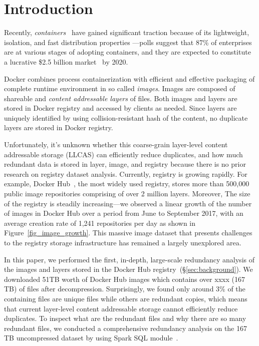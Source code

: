 \section{Introduction}

	
Recently, \emph{containers}~\cite{process-containers-linux} have
gained significant traction because of its lightweight, isolation, and fast distribution properties
---polls suggest that 87\% of enterprises are
at various stages of adopting containers, and they are expected to
constitute a lucrative \$2.5 billion
market~\cite{container-grow-by2020} by 2020.

Docker combines process containerization with efficient and
effective packaging of complete runtime environment
in so called {\em images}.
Images are composed of shareable and
{\em content addressable layers} of files. Both images
and layers are stored in Docker registry and accessed by clients as needed. 
Since 
layers are uniquely identified by using collision-resistant hash of the content, no duplicate layers are stored in Docker registry.

Unfortunately, it's unknown whether  
this coarse-grain layer-level content addressable storage (LLCAS) can efficiently reduce duplicates, and how much redundant data is stored in layer, image, and registry because there is no prior research on registry dataset analysis. Currently, registry is growing rapidly. For example,   
Docker Hub~\cite{docker-hub}, the most widely used registry, stores more than 500,000 public image repositories comprising of over 2 million layers. Moreover,
The size of the registry 
is steadily increasing---we observed a linear growth of the
number of images in Docker Hub over a period from June to September 2017, with an average creation rate of 1,241
repositories per day as shown in Figure~\ref{fig_image_growth}.
This massive image dataset 
that presents challenges to the registry
storage infrastructure has remained a largely unexplored
area.

In this paper, we performed the first, in-depth, large-scale 
redundancy analysis of the images and layers stored in the Docker Hub
registry~(\S\ref{sec:background}). 
We downloaded 51TB worth
of Docker Hub images which contains over xxxx (167 TB) of files after decompression. 
Surprisingly, we found only around 3\% of the
containing files are unique files while others are redundant copies, 
which means that current layer-level content
addressable storage cannot efficiently reduce duplicates.
To inspect what are the redundant files and why there are so many redundant files, 
we conducted a 
comprehensive redundancy analysis on the 167 TB uncompressed dataset by using Spark SQL module~\cite{xxxx}.

